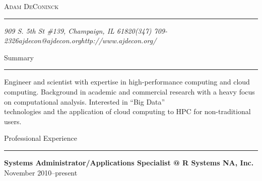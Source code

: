 \documentclass[11pt]{article}
\makeatletter
\newcommand{\name}{Adam DeConinck}
\newcommand{\addr}{909 S. 5th St \#139, Champaign, IL 61820}
\newcommand{\phone}{(347) 709-2326}
\newcommand{\email}{ajdecon@ajdecon.org}
\newcommand{\website}{http://www.ajdecon.org/}
\newcommand{\linkedin}{http://www.linkedin.com/in/ajdecon}
\newcommand{\bigname}[1]{
	\begin{center}\fontfamily{phv}\selectfont\Huge\scshape#1\end{center}
}
\newcommand{\bigsection}[1]{	
	\vspace{4pt}
	{\fontfamily{phv}\selectfont\Large#1}

	\vspace{-10pt} \rule{\textwidth}{1pt}
}
\newcommand{\jobitem}[4]{
    \vspace{2pt}

    \textbf{#1 @ #2} \hfill #3 %

    \vspace{-8pt}
}
\makeatother
\begin{document}
 \selectfont

\bigname{\name}

\vspace{-8pt} \rule{\textwidth}{1pt}

\vspace{-1pt} {\small\itshape \addr \hfill \phone \hfill \email \hfill \website} %

\vspace{6pt}
\bigsection{Summary}
Engineer and scientist with expertise in high-performance computing and cloud computing. 
Background in academic and commercial research with a heavy focus on computational analysis. Interested in ``Big Data'' \\ technologies and the application of cloud computing to HPC for non-traditional users. 

\vspace{4pt}
\bigsection{Professional Experience}

\vspace{-10pt}

\jobitem{Systems Administrator/Applications Specialist}{R Systems NA, Inc.}{November 2010--present}{Champaign, IL}
\end{document}
